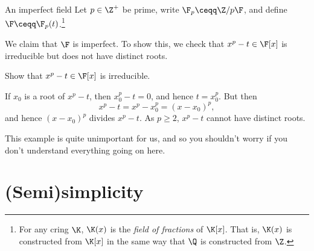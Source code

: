 \begin{exm}{An imperfect field}{}
	Let $p\in \Z ^+$ be prime, write $\F _p\ceqq \Z /p\F$, and define $\F \ceqq \F _p(t)$.\footnote{For any cring $\K$, $\K (x)$ is the \emph{field of fractions} of $\K [x]$.  That is, $\K (x)$ is constructed from $\K [x]$ in the same way that $\Q$ is constructed from $\Z$.}
	
	We claim that $\F$ is imperfect.  To show this, we check that $x^p-t\in \F [x]$ is irreducible but does not have distinct roots.
	\begin{exr}[breakable=false]{}{}
		Show that $x^p-t\in \F [x]$ is irreducible.
	\end{exr}
	If $x_0$ is a root of $x^p-t$, then $x_0^p-t=0$, and hence $t=x_0^p$.  But then
	\begin{equation}
	x^p-t=x^p-x_0^p=(x-x_0)^p,
	\end{equation}
	and hence $(x-x_0)^p$ divides $x^p-t$.  As $p\geq 2$, $x^p-t$ cannot have distinct roots.
	\begin{rmk}
		This example is quite unimportant for us, and so you shouldn't worry if you don't understand everything going on here.
	\end{rmk}
\end{exm}

\section{(Semi)simplicity}

